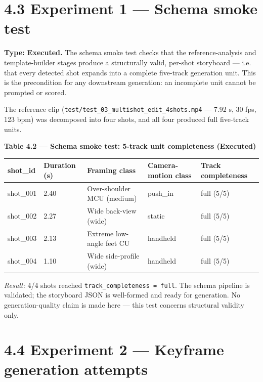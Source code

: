 \documentclass[10pt,twocolumn,letterpaper]{article}
\begin{document}
\section*{4.3 Experiment 1 --- Schema smoke test}

\textbf{Type: Executed.} The schema smoke test checks that the reference-analysis and template-builder stages produce a structurally valid, per-shot storyboard --- i.e. that every detected shot expands into a complete five-track generation unit. This is the precondition for any downstream generation: an incomplete unit cannot be prompted or scored.

The reference clip (\texttt{test/test\_03\_multishot\_edit\_4shots.mp4} --- 7.92 s, 30 fps, 123 bpm) was decomposed into four shots, and all four produced full five-track units.

\begin{table}[t]
\centering
{\footnotesize\textbf{\textbf{Table 4.2 --- Schema smoke test: 5-track unit completeness (Executed)}}}\par\vspace{3pt}
\footnotesize
\begin{tabularx}{\textwidth}{ll>{\RaggedRight\arraybackslash}X>{\RaggedRight\arraybackslash}X>{\RaggedRight\arraybackslash}X}
\toprule
shot\_id & Duration (s) & Framing class & Camera-motion class & Track completeness \\
\midrule
shot\_001 & 2.40 & Over-shoulder MCU (medium) & push\_in & full (5/5) \\
shot\_002 & 2.27 & Wide back-view (wide) & static & full (5/5) \\
shot\_003 & 2.13 & Extreme low-angle feet CU & handheld & full (5/5) \\
shot\_004 & 1.10 & Wide side-profile (wide) & handheld & full (5/5) \\
\bottomrule
\end{tabularx}
\end{table}

\emph{Result:} 4/4 shots reached \texttt{track\_completeness = full}. The schema pipeline is validated; the storyboard JSON is well-formed and ready for generation. No generation-quality claim is made here --- this test concerns structural validity only.

\section*{4.4 Experiment 2 --- Keyframe generation attempts}
\end{document}
